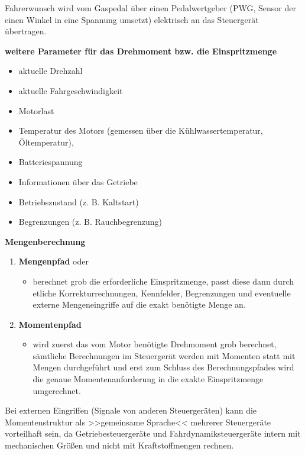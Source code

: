 Fahrerwunsch wird vom Gaspedal über einen Pedalwertgeber (PWG, Sensor
der einen Winkel in eine Spannung umsetzt) elektrisch an das Steuergerät
übertragen.

\textbf{weitere Parameter für das Drehmoment bzw. die Einspritzmenge}

\begin{itemize}
\item
  aktuelle Drehzahl
\item
  aktuelle Fahrgeschwindigkeit
\item
  Motorlast
\item
  Temperatur des Motors (gemessen über die Kühlwassertemperatur,
  Öltemperatur),
\item
  Batteriespannung
\item
  Informationen über das Getriebe
\item
  Betriebszustand (z. B. Kaltstart)
\item
  Begrenzungen (z. B. Rauchbegrenzung)
\end{itemize}

\textbf{Mengenberechnung}

\begin{enumerate}
\item
  \textbf{Mengenpfad} oder

  \begin{itemize}
  \item
    berechnet grob die erforderliche Einspritzmenge, passt diese dann
    durch etliche Korrekturrechnungen, Kennfelder, Begrenzungen und
    eventuelle externe Mengeneingriffe auf die exakt benötigte Menge an.
  \end{itemize}
\item
  \textbf{Momentenpfad}

  \begin{itemize}
  \item
    wird zuerst das vom Motor benötigte Drehmoment grob berechnet,
    sämtliche Berechnungen im Steuergerät werden mit Momenten statt mit
    Mengen durchgeführt und erst zum Schluss des Berechnungspfades wird
    die genaue Momentenanforderung in die exakte Einspritzmenge
    umgerechnet.
  \end{itemize}
\end{enumerate}

Bei externen Eingriffen (Signale von anderen Steuergeräten) kann die
Momentenstruktur als >>gemeinsame Sprache<< mehrerer Steuergeräte
vorteilhaft sein, da Getriebesteuergeräte und Fahrdynamiksteuergeräte
intern mit mechanischen Größen und nicht mit Kraftstoffmengen rechnen.

